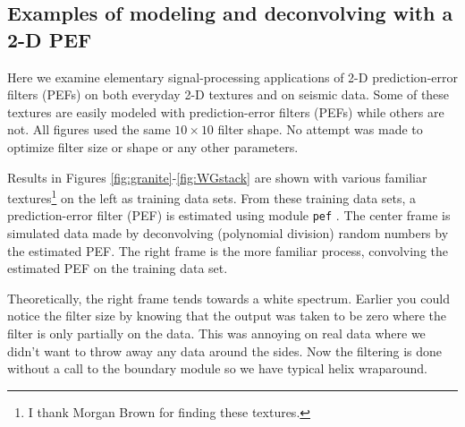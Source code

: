 \subsection{Examples of modeling and deconvolving with a 2-D PEF }
Here we examine elementary signal-processing applications of
2-D prediction-error filters (PEFs)
on both everyday 2-D textures and on seismic data.
Some of these textures are easily modeled with
prediction-error filters (PEFs) while others are not.
All figures used the same $10\times 10$ filter shape.
No attempt was made to optimize filter size
or shape or any other parameters.

\par
Results in Figures
\ref{fig:granite}-\ref{fig:WGstack}
are shown with various familiar textures\footnote{
	I thank Morgan Brown for finding these textures.
	}
on the left
as training data sets.
From these training data sets,
a prediction-error filter (PEF) is estimated
using module \texttt{pef} .
The center frame is simulated data made by deconvolving
(polynomial division) random numbers by the estimated PEF.
The right frame is the more familiar process,
convolving the estimated PEF on the training data set.


\par
Theoretically, the right frame tends towards a white spectrum.
Earlier you could notice
the filter size by knowing that the output
was taken to be zero where the filter is only partially on the data.
This was annoying on real data where we didn't want to throw
away any data around the sides.
Now the filtering is done without a call to the boundary module
so we have typical helix wraparound.




